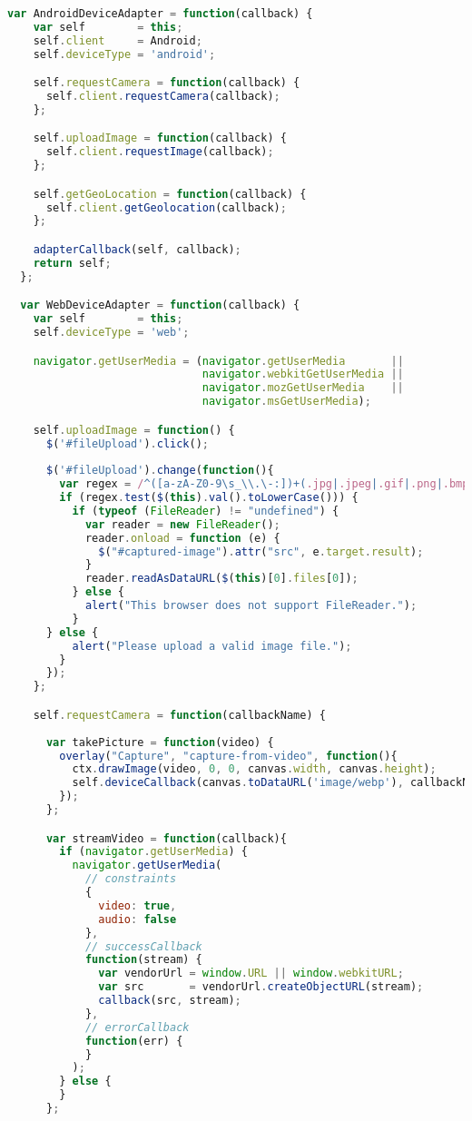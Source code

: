\begin{appendices}
\begin{lstlisting}[language=JavaScript]
  var AndroidDeviceAdapter = function(callback) {
    var self        = this;
    self.client     = Android;
    self.deviceType = 'android';

    self.requestCamera = function(callback) {
      self.client.requestCamera(callback);
    };

    self.uploadImage = function(callback) {
      self.client.requestImage(callback);
    };

    self.getGeoLocation = function(callback) {
      self.client.getGeolocation(callback);
    };

    adapterCallback(self, callback);
    return self;
  };

  var WebDeviceAdapter = function(callback) {
    var self        = this;
    self.deviceType = 'web';

    navigator.getUserMedia = (navigator.getUserMedia       ||
                              navigator.webkitGetUserMedia ||
                              navigator.mozGetUserMedia    ||
                              navigator.msGetUserMedia);

    self.uploadImage = function() {
      $('#fileUpload').click();
      
      $('#fileUpload').change(function(){
        var regex = /^([a-zA-Z0-9\s_\\.\-:])+(.jpg|.jpeg|.gif|.png|.bmp)$/;
        if (regex.test($(this).val().toLowerCase())) {
          if (typeof (FileReader) != "undefined") {
            var reader = new FileReader();
            reader.onload = function (e) {
              $("#captured-image").attr("src", e.target.result);
            }
            reader.readAsDataURL($(this)[0].files[0]);
          } else {
            alert("This browser does not support FileReader.");
          }
      } else {
          alert("Please upload a valid image file.");
        }
      });
    };

    self.requestCamera = function(callbackName) {
      
      var takePicture = function(video) {
        overlay("Capture", "capture-from-video", function(){
          ctx.drawImage(video, 0, 0, canvas.width, canvas.height);
          self.deviceCallback(canvas.toDataURL('image/webp'), callbackName);
        });
      };

      var streamVideo = function(callback){
        if (navigator.getUserMedia) {
          navigator.getUserMedia(
            // constraints
            {
              video: true,
              audio: false
            },
            // successCallback
            function(stream) {
              var vendorUrl = window.URL || window.webkitURL;
              var src       = vendorUrl.createObjectURL(stream);
              callback(src, stream);
            },
            // errorCallback
            function(err) {
            }
          );
        } else {
        }
      };


\end{lstlisting}
\end{appendices}
